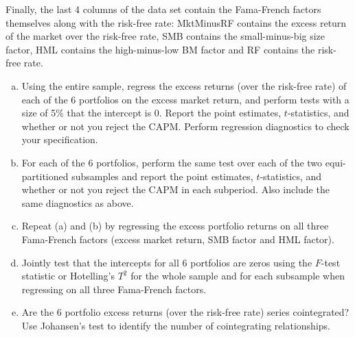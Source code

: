 Finally, the last 4 columns of the data set contain the Fama-French factors themselves along with the risk-free rate: MktMinusRF contains the excess return of the market over the risk-free rate, SMB contains the small-minus-big size factor, HML contains the high-minus-low BM factor and RF contains the risk-free rate.
	\begin{enumerate}[(a)]
	\item Using the entire sample, regress the excess returns (over the risk-free rate) of each of the 6 portfolios on the excess market return, and perform tests with a size of 5\% that the intercept is 0. Report the point estimates, $t$-statistics, and whether or not you reject the CAPM. Perform regression diagnostics to check your specification.
	\item For each of the 6 portfolios, perform the same test over each of the two equi-partitioned subsamples and report the point estimates, $t$-statistics, and whether or not you reject the CAPM in each subperiod. Also include the same diagnostics as above.
	\item Repeat (a) and (b) by regressing the excess portfolio returns on all three Fama-French factors (excess market return, SMB factor and HML factor).
	\item Jointly test that the intercepts for all 6 portfolios are zeros using the $F$-test statistic or Hotelling's $T^2$ for the whole sample and for each subsample when regressing on all three Fama-French factors.
	\item Are the 6 portfolio excess returns (over the risk-free rate) series cointegrated? Use Johansen's test to identify the number of cointegrating relationships. \twomedskip
	\end{enumerate}


